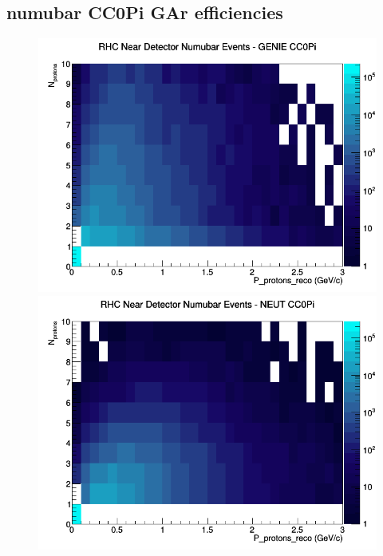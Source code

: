 \subsection{numubar CC0Pi GAr efficiencies}
\begin{figure}[h]
\includegraphics[width=\linewidth]{eff_N_P/GAr/protons/CC0Pi_RHC_ND_numubar_N_P_GENIE.png}
\endminipage
{}
\includegraphics[width=\linewidth]{eff_N_P/GAr/protons/CC0Pi_RHC_ND_numubar_N_P_NEUT.png}
\endminipage
{}

\end{figure}
